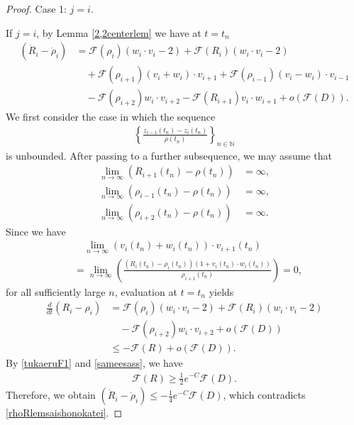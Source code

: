 \documentclass[reqno]{amsart}
\theoremstyle{plain}
\theoremstyle{definition}
\numberwithin{equation}{section}
\begin{document}
\begin{proof}
Case 1: $j=i$.


If $j=i$, by Lemma \ref{2,2centerlem} we have at $t=t_n$
\begin{align*}
\left(\dot{R}_i-\dot{\rho}_i\right)
&=
\mathcal{F}(\rho_i)(w_i\cdot v_i-2)
+\mathcal{F}(R_i)(w_i\cdot v_i-2)
\\
&\quad
+\mathcal{F}(\rho_{i+1})(v_i+w_i)\cdot v_{i+1}
+\mathcal{F}(\rho_{i-1})(v_i-w_i)\cdot v_{i-1}
\\
&\quad
-\mathcal{F}(\rho_{i+2})w_i\cdot v_{i+2}
-\mathcal{F}(R_{i+1})v_i\cdot w_{i+1}
+o\left(\mathcal{F}(D)\right).
\end{align*}
We first consider the case in which the sequence
\begin{align*}
\left\{
\frac{z_{i-1}(t_n)-z_i(t_n)}{\rho(t_n)}
\right\}_{n\in\mathbb{N}}
\end{align*}
is unbounded. After passing to a further subsequence, we may assume that
\begin{align*}
\lim_{n\to\infty}\left(R_{i+1}(t_n)-\rho(t_n)\right)&=\infty,
\\
\lim_{n\to\infty}\left(\rho_{i-1}(t_n)-\rho(t_n)\right)&=\infty,
\\
\lim_{n\to\infty}\left(\rho_{i+2}(t_n)-\rho(t_n)\right)&=\infty.
\end{align*}
Since we have
\begin{align*}
&\quad \lim_{n\to\infty}\left(v_i(t_n)+w_i(t_n)\right)\cdot v_{i+1}(t_n)
\\
&=\lim_{n\to\infty}\left(\frac{\left(R_i(t_n)-\rho_i(t_n)\right)\left(1+v_i(t_n)\cdot w_i(t_n)\right)}{\rho_{i+1}(t_n)}\right)=0,
\end{align*}
for all sufficiently large $n$, evaluation at $t=t_n$ yields
\begin{align*}
\frac{d}{dt}\left(R_i-\rho_i\right)&=\mathcal{F}(\rho_i)(w_i\cdot v_i-2)+\mathcal{F}(R_i)(w_i\cdot v_i-2)
\\
&\quad -\mathcal{F}(\rho_{i+2})w_i\cdot v_{i+2}+o\left(\mathcal{F}(D)\right)
\\
&\leq -\mathcal{F}(R)+o\left(\mathcal{F}(D)\right).
\end{align*}
By \eqref{tukaeruF1} and \eqref{sameesass}, we have
\begin{align*}
\mathcal{F}(R)\geq \frac{1}{2}e^{-C}\mathcal{F}(D).
\end{align*}
Therefore, we obtain $\left(\dot{R}_i-\dot{\rho}_i\right)\leq -\frac{1}{4}e^{-C}\mathcal{F}(D)$, which contradicts \eqref{rhoRlemsaishonokatei}.


\end{proof}
\end{document}
